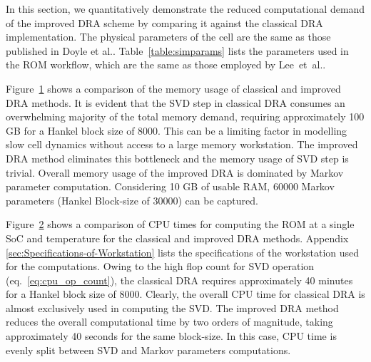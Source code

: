 In this section, we quantitatively demonstrate the reduced computational
demand of the improved DRA scheme by comparing it against the classical
DRA implementation. The physical parameters of the cell are the same
as those published in Doyle et al.\citep{FullerDoyleNewman1994}.
Table~\ref{table:simparams} lists the parameters used in the ROM
workflow, which are the same as those employed by Lee~et~al.\citep{LeeChemistruckPlett2012}.

\begin{figure}
	\caption{}
	\label{memory}
\end{figure}

Figure~\ref{memory} shows a comparison of the memory usage of
classical and improved DRA methods. It is evident that the SVD step
in classical DRA consumes an overwhelming majority of the total memory
demand, requiring approximately 100 GB for a Hankel block size of
8000. This can be a limiting factor in modelling slow cell dynamics
without access to a large memory workstation. The improved DRA method
eliminates this bottleneck and the memory usage of SVD step is trivial.
Overall memory usage of the improved DRA is dominated by Markov parameter
computation. Considering 10 GB of usable RAM, 60000 Markov parameters
(Hankel Block-size of 30000) can be captured.

Figure~\ref{cputime} shows a comparison of CPU times for computing
the ROM at a single SoC and temperature for the classical and improved
DRA methods. Appendix \ref{sec:Specifications-of-Workstation} lists the specifications
of the workstation used for the computations. Owing to the high flop
count for SVD operation (eq.~\ref{eq:cpu_op_count}), the classical
DRA requires approximately 40 minutes for a Hankel block size of 8000.
Clearly, the overall CPU time for classical DRA is almost exclusively
used in computing the SVD. The improved DRA method reduces the overall
computational time by two orders of magnitude, taking approximately
40 seconds for the same block-size. In this case, CPU time is evenly
split between SVD and Markov parameters computations.

\begin{figure}
	\caption{}
	\label{cputime}
\end{figure}


